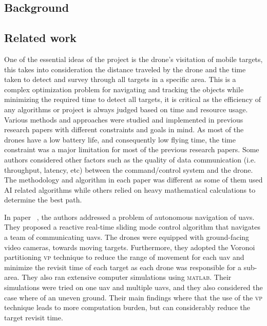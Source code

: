 \documentclass[../main.tex]{subfiles}
\begin{document}
	
	\subsection{Background}
	
	\blindtext
	
	\subsection{Related work}
	
	
	
	One of the essential ideas of the project is the drone's visitation of mobile 
	targets, this takes into consideration the distance traveled by the drone and the time taken to detect and survey through all targets in a specific area.
	This is a complex optimization problem for navigating and tracking the objects while minimizing the required time to detect all targets,
	it is critical as the efficiency of any algorithms 
	or project is always judged based on time and resource usage.
	Various methods and approaches were studied and implemented 
	in previous research papers with different constraints and 
	goals in mind.
	As most of the drones have a low battery life, 
	and consequently low flying time, the time constraint was a major limitation 
	for most of the previous research papers. 
	Some authors considered other factors such as the quality 
	of data communication (i.e. throughput, latency, etc) between the command/control 
	system and the drone.
	The methodology and algorithm in each paper was different 
	as some of them used AI related algorithms while others relied 
	on heavy mathematical calculations to determine the best path.
	
	In paper ~\cite{hua20}, the authors \citeauthor{hua20} 
	addressed a problem of autonomous navigation of \glspl{uav}. 
	They proposed a reactive real-time sliding mode control algorithm 
	that navigates a team of communicating \glspl{uav}.
	The drones were equipped with ground-facing video cameras,
	towards moving targets. 
	Furthermore, they adopted the Voronoi partitioning \textsc{vp} technique 
	to reduce the range of movement for each \gls{uav} and 
	minimize the revisit time of each target as each drone was responsible 
	for a sub-area.
	They also ran extensive computer simulations using \textsc{matlab}. 
	Their simulations were tried on one \gls{uav} and multiple \glspl{uav},
	and they also considered the case where of an uneven ground. 
	Their main findings where that the use of the \textsc{vp} technique 
	leads to more computation burden, but can considerably reduce the target 
	revisit time.
	
\end{document}

